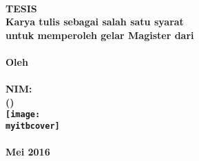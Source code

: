 \thispagestyle{empty}
\begin{center}
\textbf{\large
	\MakeUppercase{\judul} \\
	\vfill
	TESIS \\
	\bigskip
	{\normalsize
		Karya tulis sebagai salah satu syarat \\
		untuk memperoleh gelar Magister dari \\
		\itb{} \\
	}
	\vfill
	{\normalsize Oleh} \\
	\MakeUppercase{\myname{}} \\
	NIM: \mysid{} \\
	(\mydept{}) \\
	\vfill
	\texttt{[image: \\myitbcover]} \\
	\vfill
	\MakeUppercase{\itb{}} \\
	Mei 2016 \\
}
\end{center}
